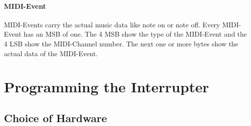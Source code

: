 \subsubsection{MIDI-Event}

MIDI-Events carry the actual music data like note on or note off. Every MIDI-Event has an MSB of one. The 4 MSB show the type of the MIDI-Event and the 4 LSB show the MIDI-Channel number. The next one or more bytes show the actual data of the MIDI-Event.



\chapter{Programming the Interrupter}

\section{Choice of Hardware}